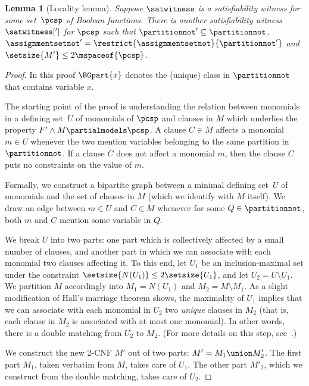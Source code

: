 \documentclass[11pt]{article}
\numberwithin{equation}{section}
\newtheorem{lemma}[theorem]{Lemma}
\theoremstyle{definition}
\theoremstyle{plain}
\begin{document}
\begin{lemma}[Locality lemma]
  \label{lem:locality}
  Suppose $\satwitness$ is a satisfiability witness for some %
  set~$\pcsp$ of Boolean functions.
  There is another satisfiability witness $\satwitness[']$ for $\pcsp$ such that $\partitionnot' \subseteq \partitionnot$, $\assignmentsetnot' = \restrict{\assignmentsetnot}{\partitionnot'}$ and $\setsize{M'} \leq 2\mspaceof{\pcsp}$.
\end{lemma}
\begin{proof}
In this proof $\BGpart{x}$ denotes the (unique) class in
$\partitionnot$ that contains variable $x$.

The starting point of the proof is understanding the relation between monomials in a %
defining set~$U$ of monomials
of $\pcsp$ and clauses in $M$ which underlies the property $F'\land M \partialmodels \pcsp$. A clause $C \in M$ affects a monomial $m \in U$ whenever the two mention variables belonging to the same partition in $\partitionnot$. If a clause $C$ does not affect a monomial $m$, then the clause $C$ puts no constraints on the value of $m$.

Formally, we construct a bipartite graph between a minimal %
defining set~$U$ of monomials
and the set of clauses in $M$ (which we identify with $M$ itself). We draw an edge between $m \in U$ and $C \in M$ whenever for some $Q \in \partitionnot$, both $m$ and $C$ mention some variable in $Q$.

We break $U$ into two parts: one part which is collectively affected by a small number of clauses, and another part in which we can associate with each monomial two clauses affecting it. To this end, let $U_1$ be an inclusion-maximal set under the constraint $\setsize{N(U_1)}\leq 2\setsize{U_1}$, and let $U_2=U\setminus U_1$. We partition $M$ accordingly into $M_1 = N(U_1)$ and $M_2 = M \setminus M_1$. As a slight modification of Hall's marriage theorem shows, the maximality of $U_1$ implies that we can associate with each monomial in $U_2$ two \emph{unique} clauses in $M_2$ (that is, each clause in $M_2$ is associated with at most one monomial). In other words, there is a double matching from $U_2$ to $M_2$. (For more details on this step, see~\cite{ABRW02SpaceComplexity,FLNRT15SpaceCplx,BG15Framework}.)

%

We construct the new 2-CNF $M'$ out of two parts: $M' = M_1 \union M'_2$. The first part $M_1$, taken verbatim from $M$, takes care of $U_1$. The other part $M'_2$, which we construct from the double matching, takes care of $U_2$.


\end{proof}
\end{document}

